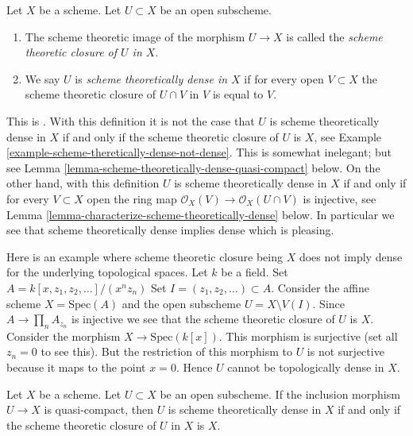 \begin{definition}
\label{definition-scheme-theoretically-dense}
Let $X$ be a scheme. Let $U \subset X$ be an open subscheme.
\begin{enumerate}
\item The scheme theoretic image of the morphism $U \to X$
is called the {\it scheme theoretic closure of $U$ in $X$}.
\item We say $U$ is {\it scheme theoretically dense in $X$}
if for every open $V \subset X$ the scheme theoretic closure
of $U \cap V$ in $V$ is equal to $V$.
\end{enumerate}
\end{definition}

\noindent
This is \cite[IV, Definition 11.10.2]{EGA}.
With this definition it is not the case that $U$ is scheme theoretically
dense in $X$ if and only if the scheme theoretic closure of $U$ is $X$,
see Example \ref{example-scheme-theretically-dense-not-dense}. This is somewhat
inelegant; but see Lemma \ref{lemma-scheme-theoretically-dense-quasi-compact}
below. On the other hand, with this definition $U$ is scheme theoretically
dense in $X$ if and only if for every $V \subset X$ open the ring map
$\mathcal{O}_X(V) \to \mathcal{O}_X(U \cap V)$ is injective, see
Lemma \ref{lemma-characterize-scheme-theoretically-dense} below.
In particular we see that scheme theoretically dense implies dense
which is pleasing.

\begin{example}
\label{example-scheme-theretically-dense-not-dense}
Here is an example where scheme theoretic closure being $X$ does not
imply dense for the underlying topological spaces.
Let $k$ be a field.
Set $A = k[x, z_1, z_2, \ldots]/(x^n z_n)$
Set $I = (z_1, z_2, \ldots) \subset A$.
Consider the affine scheme $X = \text{Spec}(A)$ and the
open subscheme $U = X \setminus V(I)$.
Since $A \to \prod_n A_{z_n}$ is injective we see that the scheme theoretic
closure of $U$ is $X$. Consider the morphism
$X \to \text{Spec}(k[x])$. This morphism is surjective
(set all $z_n = 0$ to see this). But the restriction
of this morphism to $U$ is not surjective because it maps
to the point $x = 0$. Hence $U$ cannot be topologically dense
in $X$.
\end{example}

\begin{lemma}
\label{lemma-scheme-theoretically-dense-quasi-compact}
Let $X$ be a scheme.
Let $U \subset X$ be an open subscheme.
If the inclusion morphism $U \to X$ is quasi-compact, then $U$
is scheme theoretically dense in $X$ if and only if the scheme theoretic
closure of $U$ in $X$ is $X$.
\end{lemma}

